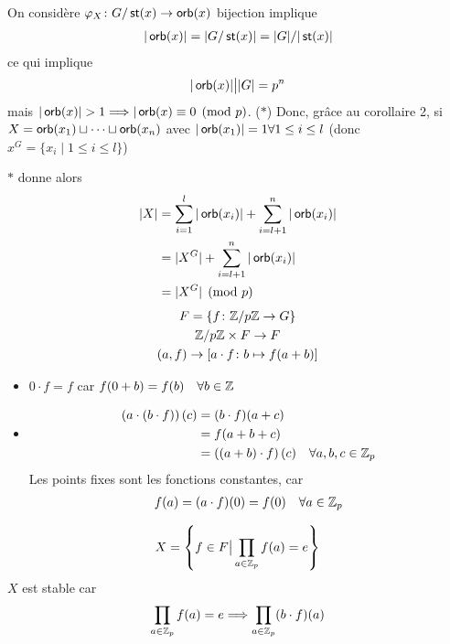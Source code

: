 \documentclass[french,a4paper,10pt]{article}
\begin{document}
	\begin{td-sol}
		On considère $\varphi_X\colon G/\operatorname{\mathsf{st}}(x)\to\operatorname{\mathsf{orb}}(x)$ bijection implique
			\[\begin{aligned}
				|\operatorname{\mathsf{orb}}(x)|=|G/\operatorname{\mathsf{st}}(x)|=|G|/|\operatorname{\mathsf{st}}(x)|
			\end{aligned}\]
		ce qui implique
			\[\begin{aligned}
				|\operatorname{\mathsf{orb}}(x)|\big||G|=p^n
			\end{aligned}\]
		mais $|\orb(x)|>1\Longrightarrow|\orb(x)\equiv 0\pmod p$.
		($\ast$) Donc, grâce au corollaire 2, si $X=\operatorname{\mathsf{orb}}(x_1)\sqcup\cdots\sqcup\operatorname{\mathsf{orb}}(x_n)$
		avec $|\operatorname{\mathsf{orb}}(x_1)|=1\forall 1\le i\le l$ (donc $x^G=\{x_i\mid 1\le i\le l\}$)
		
		$\ast$ donne alors
			\[\begin{aligned}
				|X|&=\sum_{i=1}^l|\operatorname{\mathsf{orb}}(x_i)|+\sum_{i=l+1}^n|\operatorname{\mathsf{orb}}(x_i)|\\
				&=|X^G|+\sum_{i=l+1}^n|\operatorname{\mathsf{orb}}(x_i)|\\
				&=|X^G|\pmod p
			\end{aligned}\]
		\medspace\medspace
		\[\begin{gathered}
			F=\{f\colon\mathbb{Z}/p\mathbb{Z}\to G\}\\
			\mathbb{Z}/p\mathbb{Z}\times F\to F\\
			(a,f)\to \left[a\cdot f\colon b\mapsto f(a+b)\right]
		\end{gathered}\]
		\begin{itemize}
			\item $0\cdot f=f$ car $f(0+b)=f(b)\quad\forall b\in\mathbb{Z}$\\
			\item 
				\[\begin{aligned}
					\left(a\cdot(b\cdot f)\right)(c)&=(b\cdot f)(a+c)\\&=f(a+b+c)\\&=\left((a+b)\cdot f\right)(c)\quad\forall a,b,c\in\mathbb{Z}_p
				\end{aligned}\]
			Les points fixes sont les fonctions constantes, car
				\[\begin{aligned}
					f(a)=(a\cdot f)(0)=f(0)\quad\forall a\in\mathbb{Z}_p
				\end{aligned}\]
		\end{itemize}
	\medspace\medspace
	\[\begin{gathered}
		X=\left\{f\in F\big|\prod_{a\in\mathbb{Z}_p}f(a)=e\right\}
	\end{gathered}\]
	$X$ est stable car 
		\[\begin{aligned}
			\prod_{a\in\bb Z_p}f(a)=e&\Longrightarrow\prod_{a\in\bb Z_p}(b\cdot f)(a)\\

\end{aligned}\]
\end{td-sol}
\end{document}
